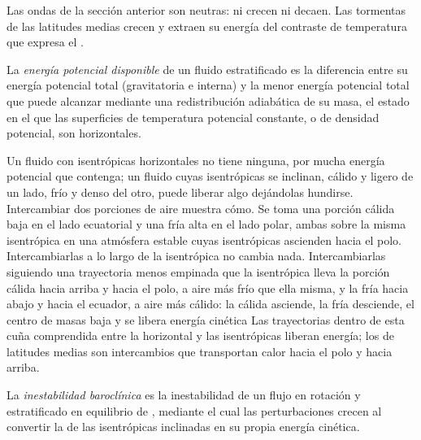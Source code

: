 Las ondas de la sección anterior son neutras: ni crecen ni decaen.
Las tormentas de las latitudes medias crecen y extraen su energía del
contraste de temperatura que expresa el .

\begin{definition}\label{def:b3:atmospheric-dynamics:ape}
La \emph{energía potencial disponible} de
un fluido estratificado es la diferencia entre su energía potencial total
(gravitatoria e interna) y la menor energía potencial total que puede
alcanzar mediante una redistribución adiabática de su masa, el estado en el que
las superficies de temperatura potencial constante, o de densidad potencial, son
horizontales.
\end{definition}

Un fluido con isentrópicas horizontales no tiene ninguna, por mucha energía potencial que
contenga; un fluido cuyas isentrópicas se inclinan, cálido y ligero de un lado, frío
y denso del otro, puede liberar algo dejándolas hundirse. Intercambiar
dos porciones de aire muestra cómo. Se toma una porción cálida baja en el lado ecuatorial y una
fría alta en el lado polar, ambas sobre la misma isentrópica en una atmósfera estable
cuyas isentrópicas ascienden hacia el polo. Intercambiarlas a lo largo de la
isentrópica no cambia nada. Intercambiarlas siguiendo una trayectoria menos empinada que la
isentrópica lleva la porción cálida hacia arriba y hacia el polo, a aire más frío que
ella misma, y la fría hacia abajo y hacia el ecuador, a aire más cálido: la cálida
asciende, la fría desciende, el centro de masas baja y se libera energía cinética
Las trayectorias dentro de esta cuña comprendida entre la horizontal y las
isentrópicas liberan energía; los  de latitudes medias son
intercambios que transportan calor hacia el polo y hacia arriba.

\begin{definition}\label{def:b3:atmospheric-dynamics:baroclinic-instability}
La \emph{inestabilidad baroclínica} es la
inestabilidad de un flujo en rotación y estratificado en equilibrio de , mediante el cual
las perturbaciones crecen al convertir la  de las
isentrópicas inclinadas en su propia energía cinética.
\end{definition}

